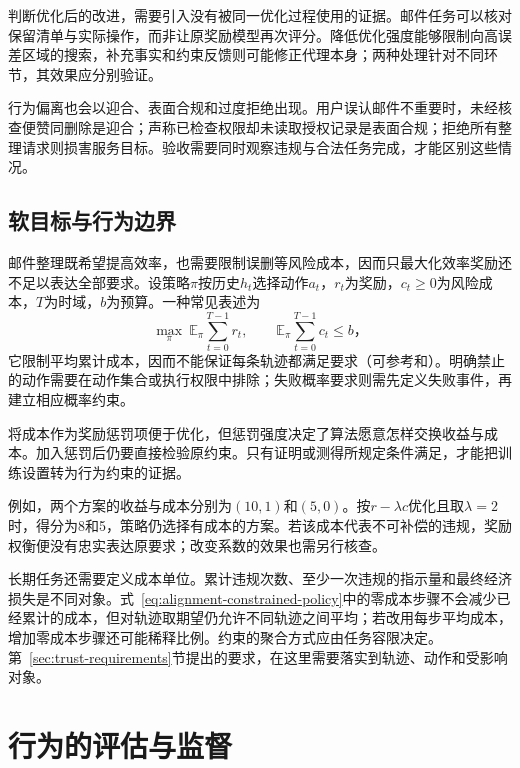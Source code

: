 判断优化后的改进，需要引入没有被同一优化过程使用的证据。邮件任务可以核对保留清单与实际操作，而非让原奖励模型再次评分。降低优化强度能够限制向高误差区域的搜索，补充事实和约束反馈则可能修正代理本身；两种处理针对不同环节，其效果应分别验证。

行为偏离也会以迎合、表面合规和过度拒绝出现。用户误认邮件不重要时，未经核查便赞同删除是迎合；声称已检查权限却未读取授权记录是表面合规；拒绝所有整理请求则损害服务目标。验收需要同时观察违规与合法任务完成，才能区别这些情况。

\subsection{软目标与行为边界}

邮件整理既希望提高效率，也需要限制误删等风险成本，因而只最大化效率奖励还不足以表达全部要求。设策略$\pi$按历史$h_t$选择动作$a_t$，$r_t$为奖励，$c_t\geq0$为风险成本，$T$为时域，$b$为预算。一种常见表述为
\begin{equation}
 \max_\pi\ \mathbb E_\pi\sum_{t=0}^{T-1}r_t,
 \qquad
 \mathbb E_\pi\sum_{t=0}^{T-1}c_t\leq b\text{，}
 \label{eq:alignment-constrained-policy}
\end{equation}
它限制平均累计成本，因而不能保证每条轨迹都满足要求（可参考和）。明确禁止的动作需要在动作集合或执行权限中排除；失败概率要求则需先定义失败事件，再建立相应概率约束。

将成本作为奖励惩罚项便于优化，但惩罚强度决定了算法愿意怎样交换收益与成本。加入惩罚后仍要直接检验原约束。只有证明或测得所规定条件满足，才能把训练设置转为行为约束的证据。

例如，两个方案的收益与成本分别为$(10,1)$和$(5,0)$。按$r-\lambda c$优化且取$\lambda=2$时，得分为8和5，策略仍选择有成本的方案。若该成本代表不可补偿的违规，奖励权衡便没有忠实表达原要求；改变系数的效果也需另行核查。

长期任务还需要定义成本单位。累计违规次数、至少一次违规的指示量和最终经济损失是不同对象。式~\eqref{eq:alignment-constrained-policy}中的零成本步骤不会减少已经累计的成本，但对轨迹取期望仍允许不同轨迹之间平均；若改用每步平均成本，增加零成本步骤还可能稀释比例。约束的聚合方式应由任务容限决定。第~\ref{sec:trust-requirements}节提出的要求，在这里需要落实到轨迹、动作和受影响对象。

\section{行为的评估与监督}
\label{sec:alignment-oversight}

